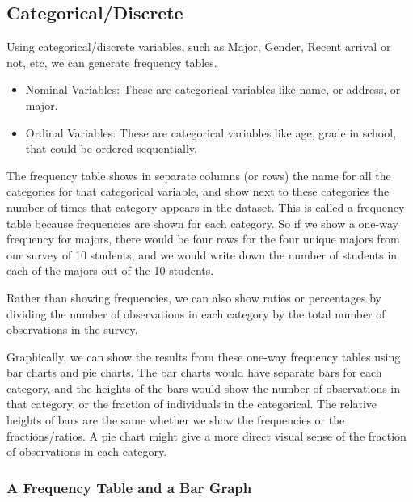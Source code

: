 \documentclass[
]{book}
\providecommand{\tightlist}{%
  \setlength{\itemsep}{0pt}\setlength{\parskip}{0pt}}
\begin{document}
\hypertarget{categoricaldiscrete}{%
\subsection{Categorical/Discrete}\label{categoricaldiscrete}}

Using categorical/discrete variables, such as Major, Gender, Recent arrival or not, etc, we can generate frequency tables.

\begin{itemize}
\tightlist
\item
  Nominal Variables: These are categorical variables like name, or address, or major.
\item
  Ordinal Variables: These are categorical variables like age, grade in school, that could be ordered sequentially.
\end{itemize}

The frequency table shows in separate columns (or rows) the name for all the categories for that categorical variable, and show next to these categories the number of times that category appears in the dataset. This is called a frequency table because frequencies are shown for each category. So if we show a one-way frequency for majors, there would be four rows for the four unique majors from our survey of 10 students, and we would write down the number of students in each of the majors out of the 10 students.

Rather than showing frequencies, we can also show ratios or percentages by dividing the number of observations in each category by the total number of observations in the survey.

Graphically, we can show the results from these one-way frequency tables using bar charts and pie charts. The bar charts would have separate bars for each category, and the heights of the bars would show the number of observations in that category, or the fraction of individuals in the categorical. The relative heights of bars are the same whether we show the frequencies or the fractions/ratios. A pie chart might give a more direct visual sense of the fraction of observations in each category.

\hypertarget{a-frequency-table-and-a-bar-graph}{%
\subsubsection{A Frequency Table and a Bar Graph}\label{a-frequency-table-and-a-bar-graph}}
\end{document}
